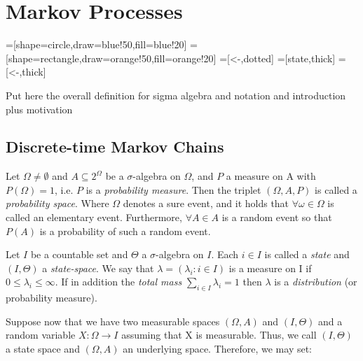 \chapter{Markov Processes}  %

\ifpdf
    \graphicspath{{Chapter1/Figs/Raster/}{Chapter1/Figs/PDF/}{Chapter1/Figs/}}
\else
    \graphicspath{{Chapter1/Figs/Vector/}{Chapter1/Figs/}}
\fi

=[shape=circle,draw=blue!50,fill=blue!20]
=[shape=rectangle,draw=orange!50,fill=orange!20]
=[<-,dotted]
=[state,thick]
=[<-,thick]

Put here the overall definition for sigma algebra and notation and introduction plus motivation

\section{Discrete-time Markov Chains} %

Let $\Omega \neq \emptyset$ and $A \subseteq 2^{\Omega}$ be a $\sigma$-algebra on $\Omega$, and $P$ a measure on A with $P(\Omega) = 1$, i.e. $P$ is a {\it probability measure}. Then the triplet $(\Omega, A, P)$ is called a {\it probability space}. Where $\Omega$ denotes a sure event, and it holds that $\forall \omega \in \Omega$ is called an elementary event. Furthermore, $\forall A \in A$ is a random event  so that $P(A)$ is a probability of such a random event. 

Let $I$ be a countable set and $\Theta$ a $\sigma$-algebra on $I$. Each $i \in I$ is called a {\it state} and $(I,\Theta)$ a {\it state-space}. We say that $\lambda = (\lambda_i : i \in I) $ is a measure on I if $0 \leq \lambda_i \leq \infty$. If in addition the {\it total mass} $\sum_{i \in I} \lambda_i = 1$ then $\lambda$ is a {\it distribution} (or probability measure). 

Suppose now that we have two measurable spaces $(\Omega,A)$ and $(I,\Theta)$ and a random variable $X: \Omega \rightarrow I$ assuming that X is measurable. Thus, we call $(I,\Theta)$ a state space and $(\Omega, A)$ an underlying space. Therefore, we may set:

